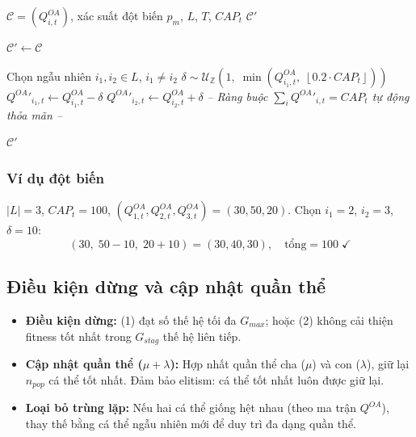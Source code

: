 \documentclass[12pt]{article}
\newcommand{\QOA}{Q^{OA}}
\begin{document}
\begin{algorithm}[H]
\caption{Đột biến hoán đổi phân bổ (Swap Allocation Mutation)}
\label{alg:mutation}
\begin{algorithmic}[1]
\Require $\mathcal{C} = (\QOA_{i,t})$, xác suất đột biến $p_m$, $L$, $T$, $CAP_t$
\Ensure $\mathcal{C}'$

\State $\mathcal{C}' \gets \mathcal{C}$

    \State Chọn ngẫu nhiên $i_1, i_2 \in L$, $i_1 \neq i_2$
    \State $\delta \sim \mathcal{U}_{\mathbb{Z}}\!\left(1,\; \min\!\left(\QOA_{i_1,t},\; \left\lfloor 0.2 \cdot CAP_t \right\rfloor\right)\right)$
    \State $\QOA'_{i_1,t} \gets \QOA_{i_1,t} - \delta$
    \State $\QOA'_{i_2,t} \gets \QOA_{i_2,t} + \delta$
    \State \textit{-- Ràng buộc $\sum_i \QOA'_{i,t} = CAP_t$ tự động thỏa mãn --}
  \EndIf
\EndFor

\State \Return $\mathcal{C}'$
\end{algorithmic}
\end{algorithm}

\subsubsection*{Ví dụ đột biến}

$|L|=3$, $CAP_t=100$, $(\QOA_{1,t}, \QOA_{2,t}, \QOA_{3,t}) = (30, 50, 20)$. Chọn $i_1=2$, $i_2=3$, $\delta=10$:
\[
  (30,\; 50-10,\; 20+10) = (30, 40, 30), \quad \text{tổng} = 100 \; \checkmark
\]

\subsection{Điều kiện dừng và cập nhật quần thể}

\begin{itemize}
  \item \textbf{Điều kiện dừng:} (1) đạt số thế hệ tối đa $G_{max}$; hoặc (2) không cải thiện fitness tốt nhất trong $G_{stag}$ thế hệ liên tiếp.
  \item \textbf{Cập nhật quần thể ($\mu + \lambda$):} Hợp nhất quần thể cha ($\mu$) và con ($\lambda$), giữ lại $n_{pop}$ cá thể tốt nhất. Đảm bảo elitism: cá thể tốt nhất luôn được giữ lại.
  \item \textbf{Loại bỏ trùng lặp:} Nếu hai cá thể giống hệt nhau (theo ma trận $\QOA$), thay thế bằng cá thể ngẫu nhiên mới để duy trì đa dạng quần thể.
\end{itemize}
\end{document}
